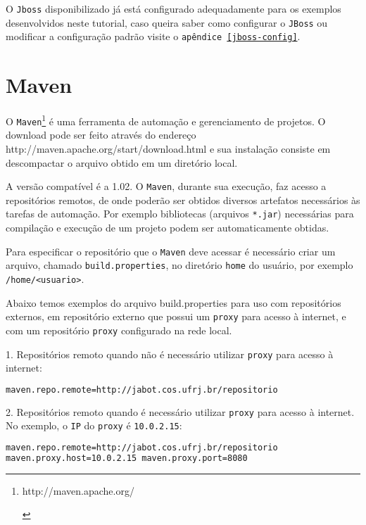 O \texttt{Jboss} disponibilizado já está configurado adequadamente para os exemplos
desenvolvidos neste tutorial, caso queira saber como configurar o \texttt{JBoss}
ou modificar a configuração padrão visite o \texttt{apêndice \ref{jboss-config}}.

\section{Maven}
O
\texttt{Maven}\footnote{\hypertarget{http://maven.apache.org/}{http://maven.apache.org/}}
é uma ferramenta de automação e gerenciamento de projetos. O download pode ser
feito através do endereço
\hypertarget{http://maven.apache.org/start/download.html}{http://maven.apache.org/start/download.html}
e sua instalação consiste em descompactar o arquivo obtido em um diretório
local.

A versão compatível é a 1.02. O \texttt{Maven}, durante sua execução, faz acesso
a repositórios remotos, de onde poderão ser obtidos diversos artefatos
necessários às tarefas de automação. Por exemplo bibliotecas (arquivos
\texttt{*.jar}) necessárias para compilação e execução de um projeto podem ser
automaticamente obtidas.

Para especificar o repositório que o \texttt{Maven} deve acessar é necessário
criar um arquivo, chamado \texttt{build.properties}, no diretório \texttt{home}
do usuário, por exemplo \texttt{/home/<usuario>}.

Abaixo temos exemplos do arquivo build.properties para uso com repositórios
externos, em repositório externo que possui um \texttt{proxy} para acesso à
internet, e com um repositório \texttt{proxy} configurado na rede local.

1. Repositórios remoto quando não é necessário utilizar \texttt{proxy} para
acesso à internet:

\begin{lstlisting}[language=bash]
maven.repo.remote=http://jabot.cos.ufrj.br/repositorio 
\end{lstlisting}

2. Repositórios remoto quando é necessário utilizar \texttt{proxy} para acesso à
internet. No exemplo, o \texttt{IP} do \texttt{proxy} é \texttt{10.0.2.15}:

\begin{lstlisting}[language=bash]
maven.repo.remote=http://jabot.cos.ufrj.br/repositorio
maven.proxy.host=10.0.2.15 maven.proxy.port=8080 
\end{lstlisting}

